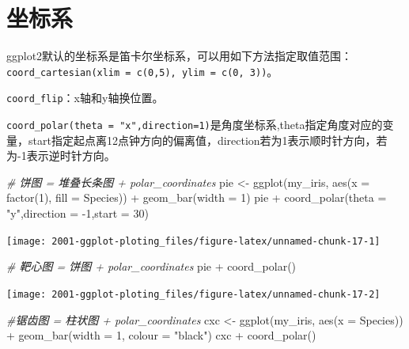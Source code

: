 \documentclass[
]{book}
\newenvironment{Shaded}{\begin{snugshade}}{\end{snugshade}}
\newcommand{\AttributeTok}[1]{\textcolor[rgb]{0.77,0.63,0.00}{#1}}
\newcommand{\CommentTok}[1]{\textcolor[rgb]{0.56,0.35,0.01}{\textit{#1}}}
\newcommand{\DecValTok}[1]{\textcolor[rgb]{0.00,0.00,0.81}{#1}}
\newcommand{\FunctionTok}[1]{\textcolor[rgb]{0.00,0.00,0.00}{#1}}
\newcommand{\NormalTok}[1]{#1}
\newcommand{\OtherTok}[1]{\textcolor[rgb]{0.56,0.35,0.01}{#1}}
\newcommand{\SpecialCharTok}[1]{\textcolor[rgb]{0.00,0.00,0.00}{#1}}
\newcommand{\StringTok}[1]{\textcolor[rgb]{0.31,0.60,0.02}{#1}}
\begin{document}
\hypertarget{ux5750ux6807ux7cfb}{%
\section{坐标系}\label{ux5750ux6807ux7cfb}}

ggplot2默认的坐标系是笛卡尔坐标系，可以用如下方法指定取值范围：\texttt{coord\_cartesian(xlim\ =\ c(0,5),\ ylim\ =\ c(0,\ 3))}。

\texttt{coord\_flip}：x轴和y轴换位置。

\texttt{coord\_polar(theta\ =\ "x",direction=1)}是角度坐标系,theta指定角度对应的变量，start指定起点离12点钟方向的偏离值，direction若为1表示顺时针方向，若为-1表示逆时针方向。

\begin{Shaded}
\begin{Highlighting}[]
\CommentTok{\# 饼图 = 堆叠长条图 + polar\_coordinates}
\NormalTok{pie }\OtherTok{\textless{}{-}} \FunctionTok{ggplot}\NormalTok{(my\_iris, }\FunctionTok{aes}\NormalTok{(}\AttributeTok{x =} \FunctionTok{factor}\NormalTok{(}\DecValTok{1}\NormalTok{), }\AttributeTok{fill =}\NormalTok{ Species)) }\SpecialCharTok{+}
  \FunctionTok{geom\_bar}\NormalTok{(}\AttributeTok{width =} \DecValTok{1}\NormalTok{)}
\NormalTok{pie }\SpecialCharTok{+} \FunctionTok{coord\_polar}\NormalTok{(}\AttributeTok{theta =} \StringTok{"y"}\NormalTok{,}\AttributeTok{direction =} \SpecialCharTok{{-}}\DecValTok{1}\NormalTok{,}\AttributeTok{start =} \DecValTok{30}\NormalTok{)}
\end{Highlighting}
\end{Shaded}

\begin{center}\texttt{[image: 2001-ggplot-ploting\_files/figure-latex/unnamed-chunk-17-1]} \end{center}

\begin{Shaded}
\begin{Highlighting}[]
\CommentTok{\# 靶心图 = 饼图 + polar\_coordinates}
\NormalTok{pie }\SpecialCharTok{+} \FunctionTok{coord\_polar}\NormalTok{()}
\end{Highlighting}
\end{Shaded}

\begin{center}\texttt{[image: 2001-ggplot-ploting\_files/figure-latex/unnamed-chunk-17-2]} \end{center}

\begin{Shaded}
\begin{Highlighting}[]
\CommentTok{\#锯齿图 = 柱状图 + polar\_coordinates}
\NormalTok{cxc }\OtherTok{\textless{}{-}} \FunctionTok{ggplot}\NormalTok{(my\_iris, }\FunctionTok{aes}\NormalTok{(}\AttributeTok{x =}\NormalTok{ Species)) }\SpecialCharTok{+}
  \FunctionTok{geom\_bar}\NormalTok{(}\AttributeTok{width =} \DecValTok{1}\NormalTok{, }\AttributeTok{colour =} \StringTok{"black"}\NormalTok{)}
\NormalTok{cxc }\SpecialCharTok{+} \FunctionTok{coord\_polar}\NormalTok{()}
\end{Highlighting}
\end{Shaded}
\end{document}
